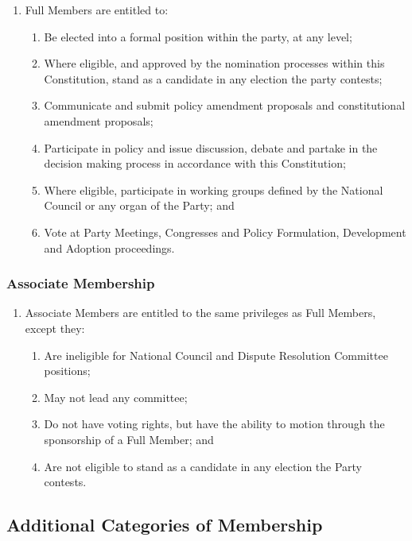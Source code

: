 \documentclass[a4paper,titlepage,8.5pt]{article}
\begin{document}
\begin{enumerate}
\item Full Members are entitled to:
\begin{enumerate}
\item Be elected into a formal position within the party, at any level;
\item Where eligible, and approved by the nomination processes within this Constitution, stand as a candidate in any election the party contests;
\item Communicate and submit policy amendment proposals and constitutional amendment proposals;
\item Participate in policy and issue discussion, debate and partake in the decision making process in accordance with this Constitution;
\item Where eligible, participate in working groups defined by the National Council or any organ of the Party; and
\item Vote at Party Meetings, Congresses and Policy Formulation, Development and Adoption proceedings.
\end{enumerate}
\end{enumerate}

\subsubsection{Associate Membership}

\begin{enumerate}
\item Associate Members are entitled to the same privileges as Full Members, except they:
\begin{enumerate}
\item Are ineligible for National Council and Dispute Resolution Committee positions;
\item May not lead any committee;
\item Do not have voting rights, but have the ability to motion through the sponsorship of a Full Member; and
\item Are not eligible to stand as a candidate in any election the Party contests.
\end{enumerate}
\end{enumerate}

\subsection{Additional Categories of Membership}
\end{document}
